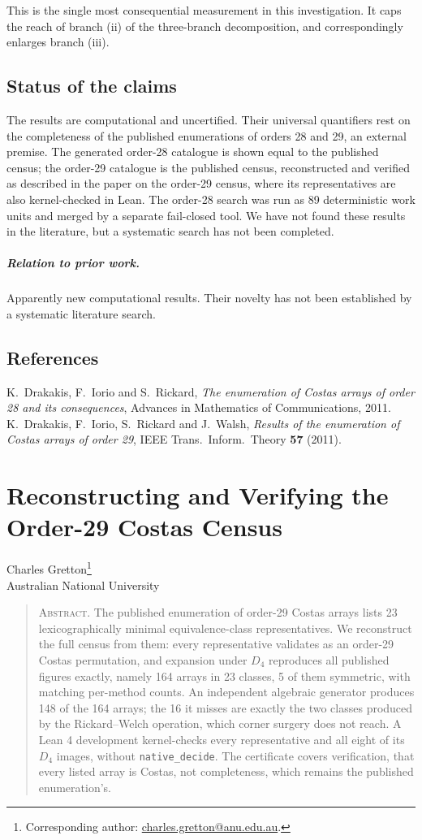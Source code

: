 \documentclass[11pt,a4paper,oneside]{report}
\makeatletter
\theoremstyle{definition}
\newcommand{\paperauthor}{\begin{center}\large Charles Gretton\footnote{Corresponding author: \href{mailto:charles.gretton@anu.edu.au}{charles.gretton@anu.edu.au}.}\\[2pt]\normalsize Australian National University\end{center}\vspace{0.5em}}
\newcommand{\paperabstract}[1]{\begin{quote}\small\noindent\textsc{Abstract.} #1\end{quote}\vspace{0.5em}}
\newenvironment{paperrefs}{\section*{References}\list{\@biblabel{\@arabic\c@enumiv}}{\settowidth\labelwidth{\@biblabel{99}}\leftmargin\labelwidth\advance\leftmargin\labelsep\usecounter{enumiv}\let\p@enumiv\@empty\renewcommand\theenumiv{\@arabic\c@enumiv}}\sloppy\small}{\endlist}
\makeatother
\begin{document}
This is the single most consequential measurement in this investigation. It caps the
reach of branch (ii) of the three-branch decomposition, and correspondingly
enlarges branch (iii).



\section{Status of the claims}\label{p3-sec:status}
The results are computational and uncertified. Their universal quantifiers rest on the
completeness of the published enumerations of orders 28 and 29, an external premise. The generated
order-28 catalogue is shown equal to the published census; the order-29 catalogue is the published
census, reconstructed and verified as described in the paper on the order-29 census, where its
representatives are also kernel-checked in Lean. The order-28 search was run as 89 deterministic
work units and merged by a separate fail-closed tool. We have not found these results in the
literature, but a systematic search has not been completed.

\paragraph{Relation to prior work.} Apparently new computational results. Their novelty has not been established by a systematic literature search.
\begin{paperrefs}
 K.~Drakakis, F.~Iorio and S.~Rickard, \emph{The enumeration of Costas arrays of order 28 and its consequences}, Advances in Mathematics of Communications, 2011.
 K.~Drakakis, F.~Iorio, S.~Rickard and J.~Walsh,
\emph{Results of the enumeration of Costas arrays of order 29}, IEEE Trans.\
Inform.\ Theory \textbf{57} (2011).
\end{paperrefs}

\clearpage
\chapter{Reconstructing and Verifying the Order-29 Costas Census}\label{p4-paper}
\paperauthor
\paperabstract{The published enumeration of order-29 Costas arrays lists 23 lexicographically minimal
equivalence-class representatives. We reconstruct the full census from them: every representative
validates as an order-29 Costas permutation, and expansion under $D_4$ reproduces all published
figures exactly, namely 164 arrays in 23 classes, 5 of them symmetric, with matching per-method
counts. An independent algebraic generator produces 148 of the 164 arrays; the 16 it misses are
exactly the two classes produced by the Rickard--Welch operation, which corner surgery does not
reach. A Lean 4 development kernel-checks every representative and all eight of its $D_4$ images,
without \texttt{native\_decide}. The certificate covers verification, that every listed array is
Costas, not completeness, which remains the published enumeration's.}
\end{document}
